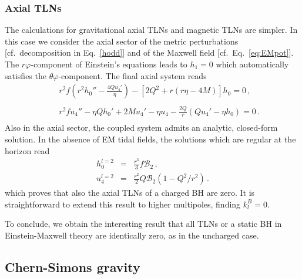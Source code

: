 \documentclass[aps,twocolumn,showpacs,preprintnumbers,nofootinbib,prd,superscriptaddress,groupedaddress,10pt]{revtex4-1}
\def\nn{\nonumber}
\newcommand{\beq}{\begin{eqnarray}}
\newcommand{\eeq}{\end{eqnarray}}
\begin{document}
\subsubsection{Axial TLNs}
The calculations for gravitational axial TLNs and magnetic TLNs
are simpler. In this case we consider the axial sector of the  metric perturbations [cf.\ decomposition in Eq.~\eqref{hodd}] and of the Maxwell field [cf.\ Eq.~\eqref{eq:EMpot}].
The $r\varphi$-component of Einstein's
equations leads to $h_1=0$ which automatically satisfies the $\theta\varphi$-component.
%
The final axial system reads
%
\begin{eqnarray}
&&r^2f \left(r^2h_0''-\frac{4Qu_4'}{{\eta}}\right)-\left[2Q^2+r\left(r{\eta} -4M\right)\right]h_0=0 \,,\nn\\ \\
%
&&r^2fu_4''-{\eta} Qh_0'+2Mu_4'-{\eta} u_4-\frac{2Q}{r}(Qu_4'-{\eta} h_0)=0 \,. \nn\\
\end{eqnarray}
Also in the axial sector, the coupled system admits an analytic, closed-form solution. In the absence of EM tidal fields, the solutions which are regular at the horizon read
%
\beq
h_0^{l=2}&=&\frac{r^3}{3} f \mathcal{B}_2\,,\\
u_4^{l=2}&=&\frac{r^2}{2}Q \mathcal{B}_2(1-Q^2/r^2)\,.
\eeq
%
which proves that also the axial TLNs of a charged BH are zero. It is straightforward to extend this result to higher multipoles, finding
$k_l^{B}=0$.

To conclude, we obtain the interesting result that all TLNs or a static BH in Einstein-Maxwell theory are identically zero, as in the uncharged case.

\subsection{Chern-Simons gravity} \label{sec:Chern}
\end{document}
